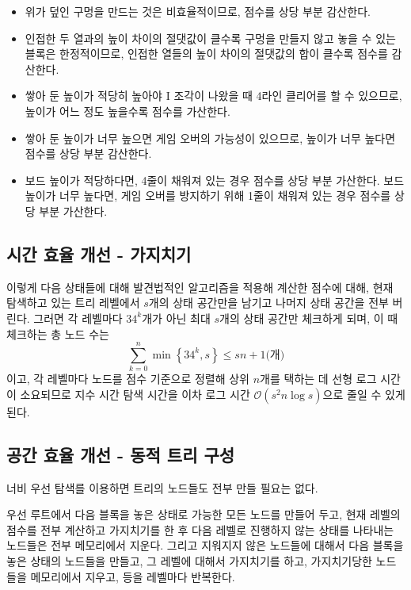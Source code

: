 \begin{itemize}
    \item 위가 덮인 구멍을 만드는 것은 비효율적이므로, 점수를 상당 부분 감산한다.
    \item 인접한 두 열과의 높이 차이의 절댓값이 클수록 구멍을 만들지 않고 놓을 수 있는 블록은 한정적이므로, 인접한 열들의 높이 차이의 절댓값의 합이 클수록 점수를 감산한다.
    \item 쌓아 둔 높이가 적당히 높아야 I 조각이 나왔을 때 4라인 클리어를 할 수 있으므로, 높이가 어느 정도 높을수록 점수를 가산한다.
    \item 쌓아 둔 높이가 너무 높으면 게임 오버의 가능성이 있으므로, 높이가 너무 높다면 점수를 상당 부분 감산한다.
    \item 보드 높이가 적당하다면, 4줄이 채워져 있는 경우 점수를 상당 부분 가산한다.
            보드 높이가 너무 높다면, 게임 오버를 방지하기 위해 1줄이 채워져 있는 경우 점수를 상당 부분 가산한다.
\end{itemize}

\subsection{시간 효율 개선 - 가지치기}

이렇게 다음 상태들에 대해 발견법적인 알고리즘을 적용해 계산한 점수에 대해, 현재 탐색하고 있는 트리 레벨에서 $s$개의 상태 공간만을 남기고
나머지 상태 공간을 전부 버린다. 그러면 각 레벨마다 $34^k$개가 아닌 최대 $s$개의 상태 공간만 체크하게 되며, 이 때 체크하는 총 노드 수는
\[\sum_{k=0}^{n} \min \left\{34^k, s\right\} \leq sn + 1\mbox{(개)}\]
이고, 각 레벨마다 노드를 점수 기준으로 정렬해 상위 $n$개를 택하는 데 선형 로그 시간이 소요되므로
지수 시간 탐색 시간을 이차 로그 시간 $\mathcal{O}\left(s^2n \log s\right)$으로 줄일 수 있게 된다. 

\subsection{공간 효율 개선 - 동적 트리 구성}
너비 우선 탐색를 이용하면 트리의 노드들도 전부 만들 필요는 없다.

우선 루트에서 다음 블록을 놓은 상태로 가능한 모든 노드를 만들어 두고, 현재 레벨의 점수를 전부 계산하고 가지치기를 한 후 다음 레벨로 진행하지 않는 상태를 나타내는
노드들은 전부 메모리에서 지운다. 그리고 지워지지 않은 노드들에 대해서 다음 블록을 놓은 상태의 노드들을 만들고, 그 레벨에 대해서 가지치기를 하고, 가지치기당한
노드들을 메모리에서 지우고, 등을 레벨마다 반복한다.

